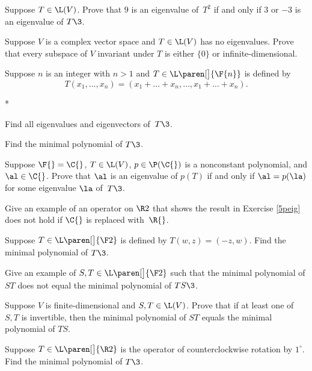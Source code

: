 
\exercise
Suppose $T \in \L(V)$.  Prove that $9$ is an
eigenvalue of~$T^2$ if and only if $3$ or $-3$ is an eigenvalue of $T\3$.


\exercise
Suppose $V$ is a complex vector space and $T \in \L(V)$ has no eigenvalues. Prove
that every subspace of $V$ invariant under $T$ is either $\{0\}$ or infinite-dimensional.


\exercise
Suppose $n$ is an integer with $n>1$ and $T \in \L\paren[\big]{\F{n}}$ is defined by
\[
T(x_1, \dots, x_n) = (x_1 + \dots + x_n, \dots, x_1 + \dots + x_n).
\]
\begin{subtheorem}*
\item
Find all eigenvalues and eigenvectors of~$T\3$.
\item
Find the minimal polynomial of $T\3$.
\end{subtheorem}


\exercise
Suppose $\F{} = \C{}$, $T \in \L(V)$, $p \in \P(\C{})$ is a nonconstant polynomial,
and $\al \in \C{}$.  Prove that $\al$ is an eigenvalue of $p(T)$ if and only if
$\al = p(\la)$ for some eigenvalue $\la$ of~$T\3$.\label{5peig}


\exercise
Give an example of an operator on $\R2$ that shows the result in Exercise \ref{5peig} does not hold if $\C{}$ is replaced with~$\R{}$.


\exercise
Suppose $T \in \L\paren[\big]{\F2}$ is defined by $T(w, z) = (-z, w)$. Find the minimal polynomial of $T\3$.


\exercise
\begin{SUBtheorem}
\item
Give an example of $S, T \in \L\paren[\big]{\F2}$ such that the minimal polynomial of $ST$ does not equal the minimal polynomial of $TS\3$.
\item
Suppose $V$ is finite-dimensional and $S, T \in \L(V)$. Prove that if at least one of $S, T$  is invertible, then the minimal polynomial of $ST$ equals the minimal polynomial of $TS$.
\end{SUBtheorem}


\exercise
Suppose $T \in \L\paren[\big]{\R2}$ is the operator of counterclockwise rotation by $1^\circ$. Find the minimal polynomial of $T\3$.



